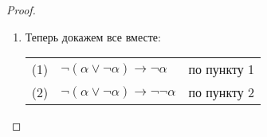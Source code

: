 \begin{proof}
\begin{enumerate}
\item
Теперь докажем все вместе:

\begin{tabular}{lll}
(1) & $\neg(\alpha\vee\neg\alpha) \rightarrow \neg\alpha$ & по пункту 1\\
(2) & $\neg(\alpha\vee\neg\alpha) \rightarrow \neg\neg\alpha$& по пункту 2\\

\end{tabular}
\end{enumerate}
\end{proof}
